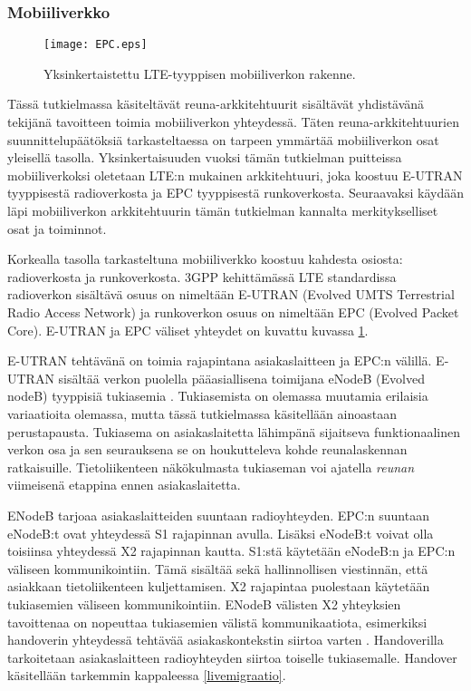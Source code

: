 \subsubsection{Mobiiliverkko}
\begin{figure}[tb]
\texttt{[image: EPC.eps]}
\caption{Yksinkertaistettu LTE-tyyppisen mobiiliverkon rakenne.} \label{fig:mobiarch}
\end{figure}

Tässä tutkielmassa käsiteltävät reuna-arkkitehtuurit sisältävät yhdistävänä tekijänä tavoitteen toimia mobiiliverkon yhteydessä. 
Täten reuna-arkkitehtuurien suunnittelupäätöksiä tarkasteltaessa on tarpeen ymmärtää mobiiliverkon osat yleisellä tasolla.
Yksinkertaisuuden vuoksi tämän tutkielman puitteissa mobiiliverkoksi oletetaan LTE:n mukainen arkkitehtuuri, joka koostuu E-UTRAN tyyppisestä radioverkosta ja EPC tyyppisestä runkoverkosta.
Seuraavaksi käydään läpi mobiiliverkon arkkitehtuurin tämän tutkielman kannalta merkitykselliset osat ja toiminnot.

Korkealla tasolla tarkasteltuna mobiiliverkko koostuu kahdesta osiosta: radioverkosta ja runkoverkosta. 3GPP kehittämässä LTE standardissa radioverkon sisältävä osuus on nimeltään E-UTRAN (Evolved UMTS Terrestrial Radio Access Network) ja runkoverkon osuus on nimeltään EPC (Evolved Packet Core).
E-UTRAN ja EPC väliset yhteydet on kuvattu kuvassa \ref{fig:mobiarch}.

E-UTRAN tehtävänä on toimia rajapintana asiakaslaitteen ja EPC:n välillä. 
E-UTRAN sisältää verkon puolella pääasiallisena toimijana eNodeB (Evolved nodeB) tyyppisiä tukiasemia \cite{etsieutran}.
Tukiasemista on olemassa muutamia erilaisia variaatioita olemassa, mutta tässä tutkielmassa käsitellään ainoastaan perustapausta.
Tukiasema on asiakaslaitetta lähimpänä sijaitseva funktionaalinen verkon osa ja sen seurauksena se on houkutteleva kohde reunalaskennan ratkaisuille. Tietoliikenteen näkökulmasta tukiaseman voi ajatella \textit{reunan} viimeisenä etappina ennen asiakaslaitetta. 

ENodeB tarjoaa asiakaslaitteiden suuntaan radioyhteyden.
EPC:n suuntaan eNodeB:t ovat yhteydessä S1 rajapinnan avulla.
Lisäksi eNodeB:t voivat olla toisiinsa yhteydessä X2 rajapinnan kautta.
S1:stä käytetään eNodeB:n ja EPC:n väliseen kommunikointiin. Tämä sisältää sekä hallinnollisen viestinnän, että asiakkaan tietoliikenteen kuljettamisen.
X2 rajapintaa puolestaan käytetään tukiasemien väliseen kommunikointiin. 
ENodeB välisten X2 yhteyksien tavoittenaa on nopeuttaa tukiasemien välistä kommunikaatiota, esimerkiksi handoverin yhteydessä tehtävää asiakaskontekstin siirtoa varten \cite{3gpplte}.
Handoverilla tarkoitetaan asiakaslaitteen radioyhteyden siirtoa toiselle tukiasemalle. Handover käsitellään tarkemmin kappaleessa \ref{livemigraatio}.

